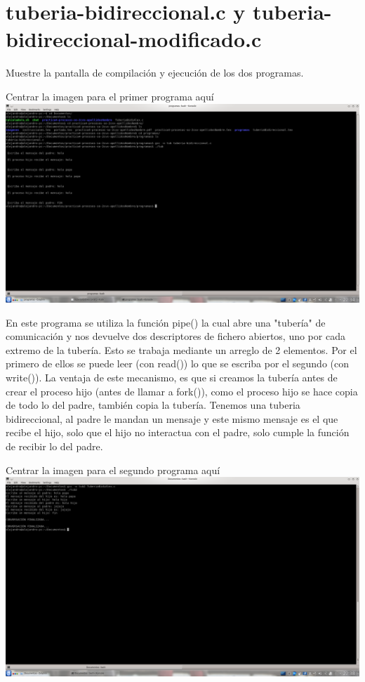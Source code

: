 \section{tuberia-bidireccional.c y tuberia-bidireccional-modificado.c}

	Muestre la pantalla de compilación y ejecución de los dos programas.

	\begin{center}
		Centrar la imagen para el primer programa aquí
		\includegraphics[scale=0.15]{imagenes/1.png}
	\end{center}
	En este programa se utiliza la función pipe() la cual abre una "tubería" de comunicación y nos devuelve dos descriptores de fichero abiertos, uno por cada extremo de la tubería. Esto se trabaja mediante un arreglo de 2 elementos. Por el primero de ellos se puede leer (con read()) lo que se escriba por el segundo (con write()). La ventaja de este mecanismo, es que si creamos la tubería antes de crear el proceso hijo (antes de llamar a fork()), como el proceso hijo se hace copia de todo lo del padre, también copia la tubería. 
		Tenemos una tuberia bidireccional, al padre le mandan un mensaje y este mismo mensaje es el que recibe el hijo, solo que el hijo no interactua con el padre, solo cumple la función de recibir lo del padre.

	\begin{center}
		Centrar la imagen para el segundo programa aquí
		\includegraphics[scale=0.15]{imagenes/2.png}
	\end{center}
	
